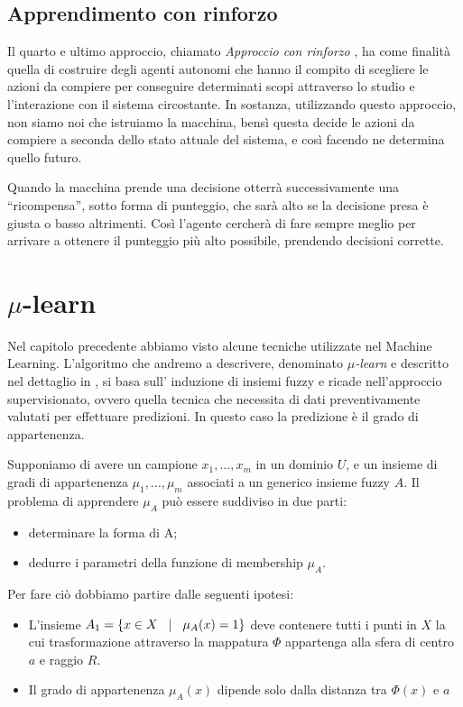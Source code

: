 \documentclass[a4paper,12pt]{report}
\begin{document}
\subsection*{Apprendimento con rinforzo}
Il quarto e ultimo approccio, chiamato \textit{Approccio con rinforzo} \cite{Reinforcement_learning}, ha come finalità quella di costruire degli agenti autonomi che hanno il compito di scegliere le azioni da compiere per conseguire determinati scopi attraverso lo studio e l'interazione con il sistema circostante.
In sostanza, utilizzando questo approccio, non siamo noi che istruiamo la macchina, bensì questa decide le azioni da compiere a seconda dello stato attuale del sistema, e così facendo ne determina quello futuro.

Quando la macchina prende una decisione otterrà successivamente una “ricompensa”, sotto forma di punteggio, che sarà alto se la decisione presa è giusta o basso altrimenti. Così l'agente cercherà di fare sempre meglio per arrivare a ottenere il punteggio più alto possibile, prendendo decisioni corrette.


\section{\texorpdfstring{$\mu$}{mu}-learn}
Nel capitolo precedente abbiamo visto alcune tecniche utilizzate nel Machine Learning. L’algoritmo che andremo a descrivere, denominato \textit{$\mu$-learn} e descritto nel dettaglio in \cite{mulearn}, si basa sull’ induzione di insiemi fuzzy e ricade nell’approccio supervisionato, ovvero quella tecnica che necessita di dati preventivamente valutati per effettuare predizioni. In questo caso la predizione è il grado di appartenenza.
\bigskip

Supponiamo di avere un campione {$x_1,\dots,x_m$} in un dominio $U$, e un insieme di gradi di appartenenza {$\mu_1,\dots,\mu_m$} associati a un generico insieme fuzzy $A$. \newline
Il problema di apprendere $\mu_A$ può essere suddiviso in due parti:
\begin{itemize}
    \item determinare la forma di A;
    \item dedurre i parametri della funzione di membership $\mu_A$.
\end{itemize}
\noindent Per fare ciò dobbiamo partire dalle seguenti ipotesi:
\begin{itemize}
    \item L'insieme $A_1 = \{ x\in X \hspace{0,3cm} |\hspace{0,3cm} \mu_A(x) = 1 \}$ deve contenere tutti i punti in $X$ la cui trasformazione attraverso la mappatura $\Phi$ appartenga alla sfera di centro $a$ e raggio $R$.
    
    \item Il grado di appartenenza $\mu_A(x)$ dipende solo dalla distanza tra $\Phi(x)$ e $a$
\end{itemize}
\end{document}
